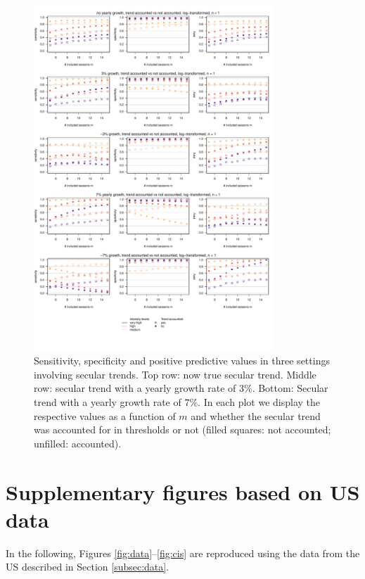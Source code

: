 \documentclass[12pt]{article}
\begin{document}
\begin{figure}[h!]
\begin{center}
\includegraphics[width = 0.8\textwidth]{figure/plot_cost_trend_fr.pdf}
\end{center}
\vspace{-10mm}
\caption{Sensitivity, specificity and positive predictive values in three settings involving secular trends. Top row: now true secular trend. Middle row: secular trend with a yearly growth rate of 3\%. Bottom: Secular trend with a yearly growth rate of 7\%. In each plot we display the respective values as a function of $m$ and whether the secular trend was accounted for in thresholds or not (filled squares: not accounted; unfilled: accounted).}
\label{fig:cost_trend}
\end{figure}

\newpage

\section{Supplementary figures based on US data}
\label{suppl:us}

In the following, Figures \ref{fig:data}--\ref{fig:cis} are reproduced using the data from the US described in Section \ref{subsec:data}.
\end{document}
